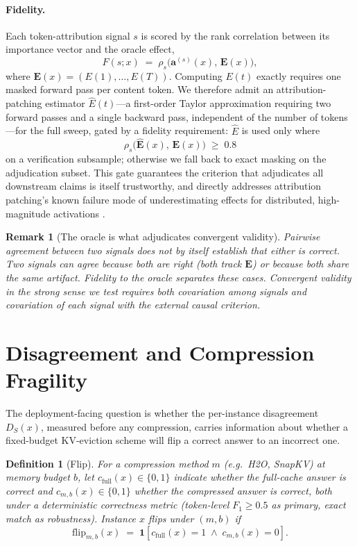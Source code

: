 \documentclass[11pt]{article}
\newtheorem{definition}{Definition}
\newtheorem{remark}{Remark}
\newcommand{\Spearman}{\rho_{s}}
\begin{document}
\paragraph{Fidelity.}
Each token-attribution signal $s$ is scored by the rank correlation between
its importance vector and the oracle effect,
\[
  F(s; x)
  \;=\;
  \Spearman\!\bigl( \mathbf{a}^{(s)}(x),\, \mathbf{E}(x) \bigr),
\]
where $\mathbf{E}(x) = (E(1),\dots,E(T))$. Computing $E(t)$ exactly requires
one masked forward pass per content token. We therefore admit an
attribution-patching estimator $\widehat{E}(t)$---a first-order Taylor
approximation requiring two forward passes and a single backward pass,
independent of the number of tokens \citep{nanda2022,kramar2024}---for the
full sweep, gated by a fidelity requirement: $\widehat{E}$ is used only where
\[
  \Spearman\!\bigl( \widehat{\mathbf{E}}(x),\, \mathbf{E}(x) \bigr) \;\ge\; 0.8
\]
on a verification subsample; otherwise we fall back to exact masking on the
adjudication subset. This gate guarantees the criterion that adjudicates all
downstream claims is itself trustworthy, and directly addresses
attribution patching's known failure mode of underestimating effects for
distributed, high-magnitude activations \citep{kramar2024}.

\begin{remark}[The oracle is what adjudicates convergent validity]
Pairwise agreement between two signals does not by itself establish that
either is correct. Two signals can agree because both are right (both track
$\mathbf{E}$) or because both share the same artifact. Fidelity to the
oracle separates these cases. Convergent validity in the strong sense we
test requires both \emph{covariation among signals} and \emph{covariation of
each signal with the external causal criterion}.
\end{remark}

\section{Disagreement and Compression Fragility}
\label{sec:fragility}

The deployment-facing question is whether the per-instance disagreement
$D_S(x)$, measured before any compression, carries information about whether
a fixed-budget KV-eviction scheme will flip a correct answer to an incorrect
one.

\begin{definition}[Flip]
For a compression method $m$ (e.g.\ H2O, SnapKV) at memory budget $b$, let
$c_{\mathrm{full}}(x) \in \{0,1\}$ indicate whether the full-cache answer is
correct and $c_{m,b}(x) \in \{0,1\}$ whether the compressed answer is
correct, both under a deterministic correctness metric (token-level $F_1
\ge 0.5$ as primary, exact match as robustness). Instance $x$
\emph{flips} under $(m,b)$ if
\[
  \mathrm{flip}_{m,b}(x) \;=\; \mathbf{1}\!\left[
    c_{\mathrm{full}}(x) = 1 \;\wedge\; c_{m,b}(x) = 0
  \right].
\]
\end{definition}
\end{document}
